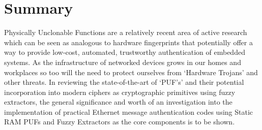 
\chapter*{Summary} %

Physically Unclonable Functions are a relatively recent area of active research which can be seen as analogous to hardware fingerprints that potentially offer a way to provide low-cost, automated, trustworthy authentication of embedded systems.
As the infrastructure of networked devices grows in our homes and workplaces so too will the need to protect ourselves from `Hardware Trojans' and other threats.
In reviewing the state-of-the-art of `PUF's' and their potential incorporation into modern ciphers as cryptographic primitives using fuzzy extractors, the general significance and worth of an investigation into the implementation of practical Ethernet message authentication codes using Static RAM PUFs and Fuzzy Extractors as the core components is to be shown.		
\cleardoublepage